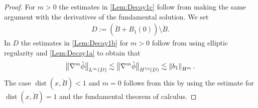 \documentclass[10pt]{amsart}
\let\backslash\setminus
\theoremstyle{definition}
\DeclareMathOperator{\dist}{dist}
\newcommand\norm[1]{\left\lVert #1\right\rVert}
\newcommand\bnorm[1]{\bigl\lVert #1\bigr\rVert}
\begin{document}
\begin{proof}
For $m>0$ the estimates in \eqref{Lem:Decay1c} follow from making the same argument with the derivatives of the fundamental solution. We set
\begin{align}\label{DefinitionD}
D:=(\grave{B}+B_1(0))\backslash \grave{B}.
\end{align}
In $D$ the estimates in \eqref{Lem:Decay1b} for $m>0$ follow from using elliptic regularity and \eqref{Lem:Decay1a} to obtain that
\begin{align*}
\bnorm{\nabla^m\grave{\phi}}_{L^\infty(D)}\lesssim \bnorm{\nabla^m\grave{\phi}}_{H^{\sfrac{4}{3}}(D)}\lesssim \norm{b_1}_{H^{m}}.
\end{align*}
The case $\dist(x,\grave{B})<1$ and $m=0$ follows from this by using the estimate for $\dist(x,\grave{B})=1$ and the fundamental theorem of calculus.
\end{proof}
\end{document}
